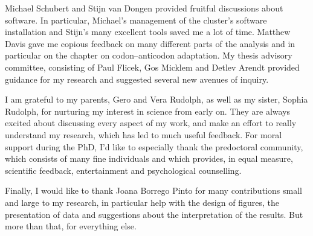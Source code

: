 Michael Schubert and Stĳn van Dongen provided fruitful discussions about
software. In particular, Michael’s management of the cluster’s software
installation and Stĳn’s many excellent tools saved me a lot of time. Matthew
Davis gave me copious feedback on many different parts of the analysis and in
particular on the chapter on codon--anticodon adaptation. My thesis advisory
committee, consisting of Paul Flicek, Gos Micklem and Detlev Arendt provided
guidance for my research and suggested several new avenues of inquiry.

I am grateful to my parents, Gero and Vera Rudolph, as well as my sister, Sophia
Rudolph, for nurturing my interest in science from early on. They are always
excited about discussing every aspect of my work, and make an effort to really
understand my research, which has led to much useful feedback. For moral support
during the PhD, I’d like to especially thank the  predoctoral
community, which consists of many fine individuals and which provides, in equal
measure, scientific feedback, entertainment and psychological counselling.

Finally, I would like to thank Joana Borrego Pinto for many contributions small
and large to my research, in particular help with the design of figures, the
presentation of data and suggestions about the interpretation of the results.
But more than that, for everything else.
